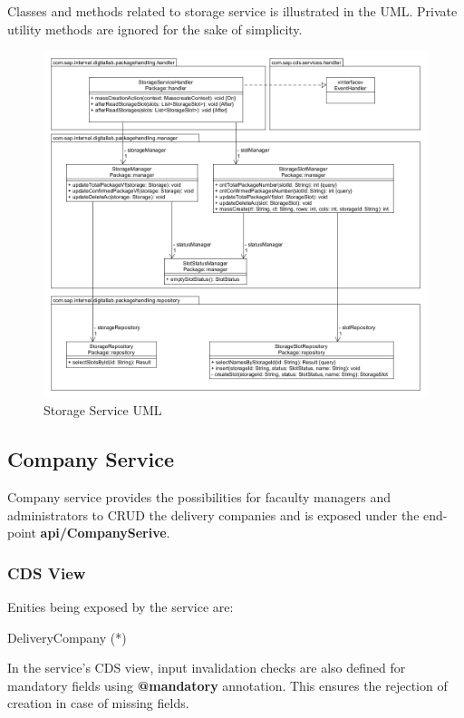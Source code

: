 Classes and methods related to storage service is illustrated in the UML. Private utility methods are ignored for the sake of simplicity.
\begin{figure}[!h]
    \centering
    \includegraphics[width=1\linewidth]{images/service_class_diagrams/storage_service_class_diagram.png}
    \caption{Storage Service UML}
    \label{fig:storage_service_uml}
\end{figure}
\pagebreak

\subsection{Company Service}
Company service provides the possibilities for facaulty managers and administrators to CRUD the delivery companies and is exposed under the end-point \textbf{api/CompanySerive}.

\subsubsection{CDS View}

Enities being exposed by the service are:
\begin{compactenum}
	\item DeliveryCompany (*)
\end{compactenum}

\bigskip
In the service's CDS view, input invalidation checks are also defined for mandatory fields using \textbf{@mandatory} annotation. This ensures the rejection of creation in case of missing fields. 


